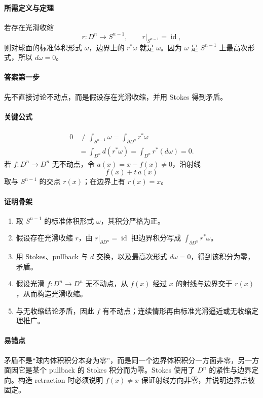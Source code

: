 \documentclass[12pt,a4paper]{ctexart}
\newcommand{\id}{\operatorname{id}}
\begin{document}
\paragraph{所需定义与定理}
若存在光滑收缩
\[
  r:D^n\to S^{n-1},\qquad r|_{S^{n-1}}=\id,
\]
则对球面的标准体积形式 $\omega$，边界上的 $r^*\omega$ 就是 $\omega$。因为 $\omega$ 是 $S^{n-1}$ 上最高次形式，所以 $d\omega=0$。

\paragraph{答案第一步}
先不直接讨论不动点，而是假设存在光滑收缩，并用 Stokes 得到矛盾。

\paragraph{关键公式}
\[
\begin{aligned}
  0
  &\ne \int_{S^{n-1}}\omega
   =\int_{\partial D^n}r^*\omega\\
  &=\int_{D^n}d(r^*\omega)
   =\int_{D^n}r^*(d\omega)
   =0.
\end{aligned}
\]
若 $f:D^n\to D^n$ 无不动点，令 $a(x)=x-f(x)\ne0$，沿射线
\[
  f(x)+t\,a(x)
\]
取与 $S^{n-1}$ 的交点 $r(x)$；在边界上有 $r(x)=x$。

\paragraph{证明骨架}
\begin{enumerate}
  \item 取 $S^{n-1}$ 的标准体积形式 $\omega$，其积分严格为正。
  \item 假设存在光滑收缩 $r$，由 $r|_{\partial D^n}=\id$ 把边界积分写成 $\int_{\partial D^n}r^*\omega$。
  \item 用 Stokes、pullback 与 $d$ 交换，以及最高次形式 $d\omega=0$，得到该积分为零，矛盾。
  \item 假设光滑 $f:D^n\to D^n$ 无不动点，从 $f(x)$ 经过 $x$ 的射线与边界交于 $r(x)$，从而构造光滑收缩。
  \item 与无收缩结论矛盾，因此 $f$ 有不动点；连续情形再由标准光滑逼近或无收缩定理推广。
\end{enumerate}

\paragraph{易错点}
矛盾不是“球内体积积分本身为零”，而是同一个边界体积积分一方面非零，另一方面因它是某个 pullback 的 Stokes 积分而为零。Stokes 使用了 $D^n$ 的紧性与边界定向。构造 retraction 时必须说明 $f(x)\ne x$ 保证射线方向非零，并说明边界点被固定。
\end{document}
